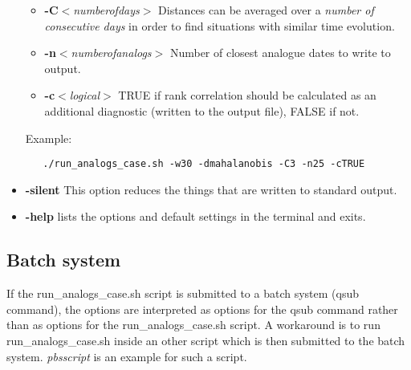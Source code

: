 \documentclass[11p,a4paper]{article}
\begin{document}
\begin{itemize}
\begin{itemize}
  \item \textbf{-C}\textit{$<$numberofdays$>$} Distances can be averaged over a \textit{number of consecutive days} in order to find situations with similar time evolution.
  \item \textbf{-n}\textit{$<$numberofanalogs$>$} Number of closest analogue dates to write to output.
  \item \textbf{-c}\textit{$<$logical$>$} TRUE if rank correlation should be calculated as an additional diagnostic (written to the output file), FALSE if not.
 \end{itemize}  
  Example:
  \begin{verbatim}
   ./run_analogs_case.sh -w30 -dmahalanobis -C3 -n25 -cTRUE
  \end{verbatim}
 \item \textbf{-silent} This option reduces the things that are written to standard output.
 \item \textbf{-help} lists the options and default settings in the terminal and exits.
 
\end{itemize} 

\subsection{Batch system}
\label{sec:batchmode}
If the run\_analogs\_case.sh script is submitted to a batch system (qsub command), the options are interpreted as options for the qsub command rather than as options for the run\_analogs\_case.sh script. A workaround is to run run\_analogs\_case.sh inside an other script which is then submitted to the batch system. \textit{pbsscript} is an example for such a script.
\end{document}
